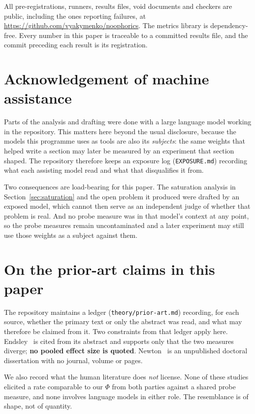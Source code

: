 \documentclass[11pt]{article}
\begin{document}
All pre-registrations, runners, results files, void documents and checkers are
public, including the ones reporting failures, at
\url{https://github.com/vyakymenko/noophorics}. The metrics library is
dependency-free. Every number in this paper is traceable to a committed results
file, and the commit preceding each result is its registration.

\section*{Acknowledgement of machine assistance}

Parts of the analysis and drafting were done with a large language model working
in the repository. This matters here beyond the usual disclosure, because the
models this programme uses as tools are also its \emph{subjects}: the same
weights that helped write a section may later be measured by an experiment that
section shaped. The repository therefore keeps an exposure log
(\texttt{EXPOSURE.md}) recording what each assisting model read and what that
disqualifies it from.

Two consequences are load-bearing for this paper. The saturation analysis in
Section~\ref{sec:saturation} and the open problem it produced were drafted by an
exposed model, which cannot then serve as an independent judge of whether that
problem is real. And no probe measure was in that model's context at any point,
so the probe measures remain uncontaminated and a later experiment may still use
those weights as a subject against them.

\section*{On the prior-art claims in this paper}

The repository maintains a ledger (\texttt{theory/prior-art.md}) recording, for
each source, whether the primary text or only the abstract was read, and what may
therefore be claimed from it. Two constraints from that ledger apply here.
Endsley~\cite{endsley2020} is cited from its abstract and supports only that the
two measures diverge; \textbf{no pooled effect size is quoted}.
Newton~\cite{newton1990} is an unpublished doctoral dissertation with no journal,
volume or pages.

We also record what the human literature does \emph{not} license. None of these
studies elicited a rate comparable to our $\Phi$ from both parties against a
shared probe measure, and none involves language models in either role. The
resemblance is of shape, not of quantity.
\end{document}
